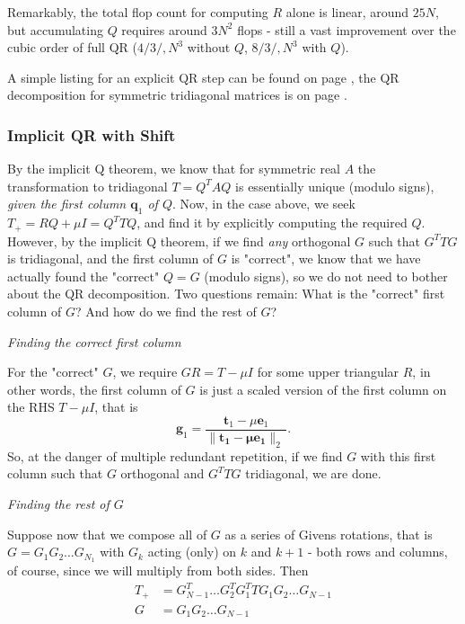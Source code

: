 \documentclass[11pt]{article}
\newcommand{\ve}[1]{\ensuremath{\mathbf{#1}}}
\newcommand{\tnorm}[1]{\ensuremath{\lVert{\ve{#1}}\rVert_2\,}}
\begin{document}
Remarkably, the total flop count for computing $R$ alone is linear, around $25N$, but accumulating $Q$ requires around $3N^2$ flops - still a vast improvement over the cubic order of full QR ($4/3/, N^3$ without $Q$, $8/3/, N^3$ with $Q$).

A simple listing for an explicit QR step can be found on page \pageref{rc:qrimstep}, the QR decomposition for symmetric tridiagonal matrices is on page \pageref{rc:qrsymtrid}.

\subsubsection{Implicit QR with Shift}
By the implicit Q theorem, we know that for symmetric real $A$ the transformation to tridiagonal $T = Q^T A Q$ is essentially unique (modulo signs), \emph{given the first column $\ve q_1$ of $Q$}. Now, in the case above, we seek $T_+ = RQ + \mu I = Q^T TQ$, and find it by explicitly computing the required $Q$. However, by the implicit Q theorem, if we find \emph{any} orthogonal $G$ such that $G^T T G$ is tridiagonal, and the first column of $G$ is "correct", we know that we have actually found the "correct" $Q=G$ (modulo signs), so we do not need to bother about the QR decomposition. Two questions remain: What is the "correct" first column of $G$? And how do we find the rest of $G$?

\emph{Finding the correct first column}

For the "correct" $G$, we require $GR=T - \mu I$ for some upper triangular $R$, in other words, the first column of $G$ is just a scaled version of the first column on the RHS $T - \mu I$, that is 
\begin{equation*}
	\ve g_1 = \frac{\ve t_1 - \mu \ve e_1}{\tnorm{\ve t_1 - \mu \ve e_1}}.
\end{equation*}
So, at the danger of multiple redundant repetition, if we find $G$ with this first column such that $G$ orthogonal and $G^TTG$ tridiagonal, we are done.

\emph{Finding the rest of $G$}

Suppose now that we compose all of $G$ as a series of Givens rotations, that is $G = G_1 G_2\ldots G_{N_1}$ with $G_k$ acting (only) on $k$ and $k+1$ - both rows and columns, of course, since we will multiply from both sides. Then
\begin{align*}
	T_+ &= G_{N-1}^T\ldots G_2^T G_1^T     T      G_1 G_2 \ldots G_{N-1} \\
	G &= G_1 G_2 \ldots G_{N-1}
\end{align*}
\end{document}
